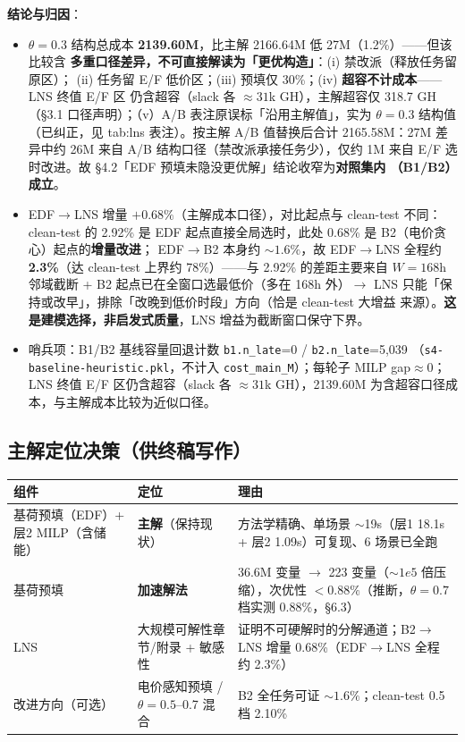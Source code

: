 \documentclass{internal-report}
\begin{document}
\textbf{结论与归因}：
\begin{itemize}
  \item $\theta{=}0.3$ 结构总成本 \textbf{2139.60M}，比主解 2166.64M 低 27M（1.2\%）——但该比较含
        \textbf{多重口径差异，不可直接解读为「更优构造」}：(i) 禁改派（释放任务留原区）；
        (ii) 任务留 E/F 低价区；(iii) 预填仅 30\%；(iv) \textbf{超容不计成本}——LNS 终值 E/F 区
        仍含超容（slack 各 $\approx 31$k GH），主解超容仅 318.7 GH（§3.1 口径声明）；（v）A/B
        表注原误标「沿用主解值」，实为 $\theta{=}0.3$ 结构值（已纠正，见 tab:lns 表注）。按主解
        A/B 值替换后合计 2165.58M：27M 差异中约 26M 来自 A/B 结构口径（禁改派承接任务少），仅约
        1M 来自 E/F 选时改进。故 §4.2「EDF 预填未隐没更优解」结论收窄为\textbf{对照集内
        （B1/B2）成立}。
  \item EDF$\to$LNS 增量 \textbf{$+0.68\%$}（主解成本口径），对比起点与 clean-test 不同：clean-test
        的 2.92\% 是 EDF 起点直接全局选时，此处 0.68\% 是 B2（电价贪心）起点的\textbf{增量改进}；
        EDF$\to$B2 本身约 $\sim 1.6\%$，故 EDF$\to$LNS 全程约 \textbf{2.3\%}（达 clean-test 上界约
        78\%）——与 2.92\% 的差距主要来自 $W{=}168$h 邻域截断 + B2 起点已在全窗口选最低价（多在
        168h 外）$\to$ LNS 只能「保持或改早」，排除「改晚到低价时段」方向（恰是 clean-test 大增益
        来源）。\textbf{这是建模选择，非启发式质量}，LNS 增益为截断窗口保守下界。
  \item 哨兵项：B1/B2 基线容量回退计数 \texttt{b1.n\_late}=0 / \texttt{b2.n\_late}=5{,}039
        （\texttt{s4-baseline-heuristic.pkl}，不计入 \texttt{cost\_main\_M}）；每轮子 MILP gap$\approx 0$；
        LNS 终值 E/F 区仍含超容（slack 各 $\approx 31$k GH），2139.60M
        为含超容口径成本，与主解成本比较为近似口径。
\end{itemize}

\subsection{主解定位决策（供终稿写作）}

\begin{center}
\footnotesize
\begin{tabular}{>{\centering\arraybackslash}p{3.6cm} >{\centering\arraybackslash}p{2.6cm} >{\raggedright\arraybackslash}p{7.0cm}}
\toprule
组件 & 定位 & 理由 \\
\midrule
基荷预填（EDF）+ 层2 MILP（含储能） & \textbf{主解}（保持现状） & 方法学精确、单场景 $\sim$19s（层1 18.1s + 层2 1.09s）可复现、6 场景已全跑 \\
基荷预填 & \textbf{加速解法} & 36.6M 变量 $\to$ 223 变量（$\sim 1e5$ 倍压缩），次优性 $<0.88\%$（推断，$\theta{=}0.7$ 档实测 0.88\%，§6.3） \\
LNS & 大规模可解性章节/附录 + 敏感性 & 证明不可硬解时的分解通道；B2$\to$LNS 增量 0.68\%（EDF$\to$LNS 全程约 2.3\%） \\
改进方向（可选） & 电价感知预填 / $\theta{=}0.5$--0.7 混合 & B2 全任务可证 $\sim 1.6\%$；clean-test 0.5 档 2.10\% \\
\bottomrule
\end{tabular}
\end{center}
\end{document}
